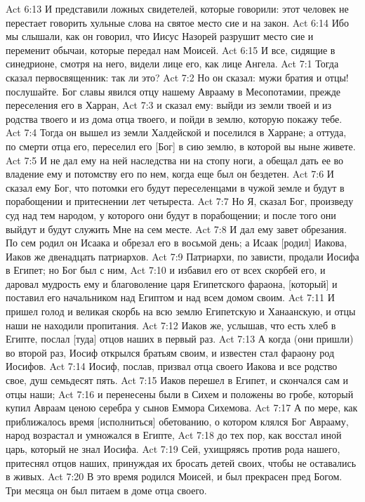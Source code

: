 Act 6:13  И представили ложных свидетелей, которые говорили: этот человек не перестает говорить хульные слова на святое место сие и на закон.
Act 6:14  Ибо мы слышали, как он говорил, что Иисус Назорей разрушит место сие и переменит обычаи, которые передал нам Моисей.
Act 6:15  И все, сидящие в синедрионе, смотря на него, видели лице его, как лице Ангела.
Act 7:1  Тогда сказал первосвященник: так ли это?
Act 7:2  Но он сказал: мужи братия и отцы! послушайте. Бог славы явился отцу нашему Аврааму в Месопотамии, прежде переселения его в Харран,
Act 7:3  и сказал ему: выйди из земли твоей и из родства твоего и из дома отца твоего, и пойди в землю, которую покажу тебе.
Act 7:4  Тогда он вышел из земли Халдейской и поселился в Харране; а оттуда, по смерти отца его, переселил его [Бог] в сию землю, в которой вы ныне живете.
Act 7:5  И не дал ему на ней наследства ни на стопу ноги, а обещал дать ее во владение ему и потомству его по нем, когда еще был он бездетен.
Act 7:6  И сказал ему Бог, что потомки его будут переселенцами в чужой земле и будут в порабощении и притеснении лет четыреста.
Act 7:7  Но Я, сказал Бог, произведу суд над тем народом, у которого они будут в порабощении; и после того они выйдут и будут служить Мне на сем месте.
Act 7:8  И дал ему завет обрезания. По сем родил он Исаака и обрезал его в восьмой день; а Исаак [родил] Иакова, Иаков же двенадцать патриархов.
Act 7:9  Патриархи, по зависти, продали Иосифа в Египет; но Бог был с ним,
Act 7:10  и избавил его от всех скорбей его, и даровал мудрость ему и благоволение царя Египетского фараона, [который] и поставил его начальником над Египтом и над всем домом своим.
Act 7:11  И пришел голод и великая скорбь на всю землю Египетскую и Ханаанскую, и отцы наши не находили пропитания.
Act 7:12  Иаков же, услышав, что есть хлеб в Египте, послал [туда] отцов наших в первый раз.
Act 7:13  А когда (они пришли) во второй раз, Иосиф открылся братьям своим, и известен стал фараону род Иосифов.
Act 7:14  Иосиф, послав, призвал отца своего Иакова и все родство свое, душ семьдесят пять.
Act 7:15  Иаков перешел в Египет, и скончался сам и отцы наши;
Act 7:16  и перенесены были в Сихем и положены во гробе, который купил Авраам ценою серебра у сынов Еммора Сихемова.
Act 7:17  А по мере, как приближалось время [исполниться] обетованию, о котором клялся Бог Аврааму, народ возрастал и умножался в Египте,
Act 7:18  до тех пор, как восстал иной царь, который не знал Иосифа.
Act 7:19  Сей, ухищряясь против рода нашего, притеснял отцов наших, принуждая их бросать детей своих, чтобы не оставались в живых.
Act 7:20  В это время родился Моисей, и был прекрасен пред Богом. Три месяца он был питаем в доме отца своего.
